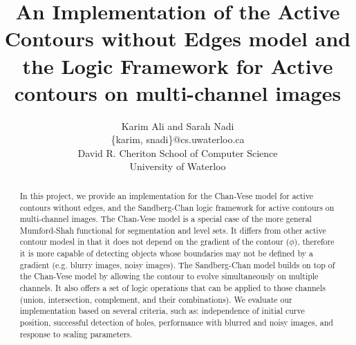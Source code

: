 \documentclass[10pt,twocolumn,letterpaper]{article}
\begin{document}
\title{An Implementation of the Active Contours without Edges model and the Logic Framework for Active contours on multi-channel images}

\author{Karim Ali and Sarah Nadi\\
\{karim, snadi\}@cs.uwaterloo.ca \\
David R. Cheriton School of Computer Science\\
University of Waterloo\\
}

\maketitle

\begin{abstract}
In this project, we provide an implementation for the Chan-Vese model for active contours without edges, and the Sandberg-Chan logic framework for active
contours on multi-channel images. The Chan-Vese model is a special case of the more general Mumford-Shah functional for segmentation and level sets. It differs
from other active contour modesl in that it does not depend on the gradient of the contour ($\phi$), therefore it is more capable of detecting objects whose
boundaries may not be defined by a gradient (e.g. blurry images, noisy images). The Sandberg-Chan model builds on top of the Chan-Vese model by allowing the
contour to evolve simultaneously on multiple channels. It also offers a set of logic operations that can be applied to those channels (union, intersection,
complement, and their combinations). We evaluate our implementation based on several criteria, such as: independence of initial curve position, successful
detection of holes, performance with blurred and noisy images, and response to scaling parameters.
\end{abstract}
\end{document}

